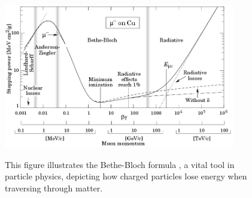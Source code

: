\begin{refsection}
        \begin{figure}
            \centering
            \includegraphics[width=0.9\textwidth]{Figures/muEDM/Entrance/BetheBloch.png}\\
            \caption[Bethe-Bloch for particles energy loss]{This figure illustrates the Bethe-Bloch formula \cite{PDG}, a vital tool in particle physics, depicting how charged particles lose energy when traversing through matter.}
            \label{fig:muEDM:entrance:BetheBloch}
        \end{figure}
        

\end{refsection}
